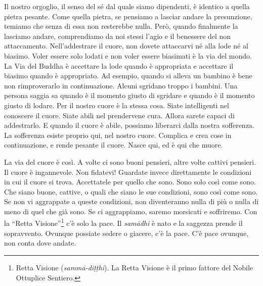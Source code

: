 Il nostro orgoglio, il senso del sé dal quale siamo dipendenti, è
identico a quella pietra pesante. Come quella pietra, se pensiamo a
lasciar andare la presunzione, temiamo che senza di essa non resterebbe
nulla. Però, quando finalmente la lasciamo andare, comprendiamo da noi
stessi l'agio e il benessere del non attaccamento. Nell'addestrare il
cuore, non dovete attaccarvi né alla lode né al biasimo. Voler essere
solo lodati e non voler essere biasimati è la via del mondo. La Via del
Buddha è accettare la lode quando è appropriata e accettare il biasimo
quando è appropriato. Ad esempio, quando si alleva un bambino è bene non
rimproverarlo in continuazione. Alcuni sgridano troppo i bambini. Una
persona saggia sa quando è il momento giusto di sgridare e quando è il
momento giusto di lodare. Per il nostro cuore è la stessa cosa. Siate
intelligenti nel conoscere il cuore. Siate abili nel prendervene cura.
Allora sarete capaci di addestrarlo. E quando il cuore è abile, possiamo
liberarci dalla nostra sofferenza. La sofferenza esiste proprio qui, nel
nostro cuore. Complica e crea cose in continuazione, e rende pesante il
cuore. Nasce qui, ed è qui che muore.

La via del cuore è così. A volte ci sono buoni pensieri, altre volte
cattivi pensieri. Il cuore è ingannevole. Non fidatevi! Guardate invece
direttamente le condizioni in cui il cuore si trova. Accettatele per
quello che sono. Sono solo così come sono. Che siano buone, cattive, o
quali che siano le sue condizioni, sono così come sono. Se non vi
aggrappate a queste condizioni, non diventeranno nulla di più o nulla di
meno di quel che già sono. Se ci aggrappiamo, saremo morsicati e
soffriremo. Con la ``Retta Visione''\footnote{Retta Visione
  (\emph{sammā-diṭṭhi}). La Retta Visione è il primo fattore del Nobile
  Ottuplice Sentiero.} c'è solo la pace. Il \emph{samādhi} è nato e la
saggezza prende il sopravvento. Ovunque possiate sedere o giacere, c'è
la pace. C'è pace ovunque, non conta dove andate.

